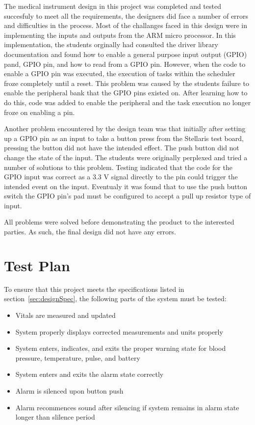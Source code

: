 \documentclass[12pt]{article} %
\begin{document}

The medical instrument design in this project was completed and tested succesfuly to meet all the requirements, the designers did face a number of errors and difficulties in the process. Most of the challanges faced in this design were in implementing the inputs and outputs from the ARM micro processor. In this implementation, the students orginally had consulted the driver library documentation and found how to enable a general purpose input output (GPIO) pand, GPIO pin, and how to read from a GPIO pin. However, when the code to enable a GPIO pin was executed, the execution of tasks within the scheduler froze completely until a reset. This problem was caused by the students failure to enable the peripheral bank that the GPIO pins existed on. After learning how to do this, code was added to enable the peripheral and the task execution no longer froze on enabling a pin.

Another problem encountered by the design team was that initially after setting up a GPIO pin as an input to take a button press from the Stellaris test board, pressing the button did not have the intended effect. The push button did not change the state of the input. The students were originally perplexed and tried a number of solutions to this problem. Testing indicated that the code for the GPIO input was correct as a 3.3 V signal directly to the pin could trigger the intended event on the input. Eventualy it was found that to use the push button switch the GPIO pin's pad must be configured to accept a pull up resistor type of input.

All problems were solved before demonstrating the product to the interested parties. As such, the final design did not have any errors.

\section{Test Plan}

To ensure that this project meets the specifications listed in 
section~\ref{sec:designSpec}, the following parts of the system must be 
tested: 

\begin{itemize}
	\item Vitals are measured and updated
	\item System properly displays corrected measurements and units properly
	\item System enters, indicates, and exits the proper warning state for blood pressure, temperature, pulse, and battery
	\item System enters and exits the alarm state correctly
	\item Alarm is silenced upon button push
	\item Alarm recommences sound after silencing if system remains in alarm state longer than slilence period
\end{itemize}
\end{document}

